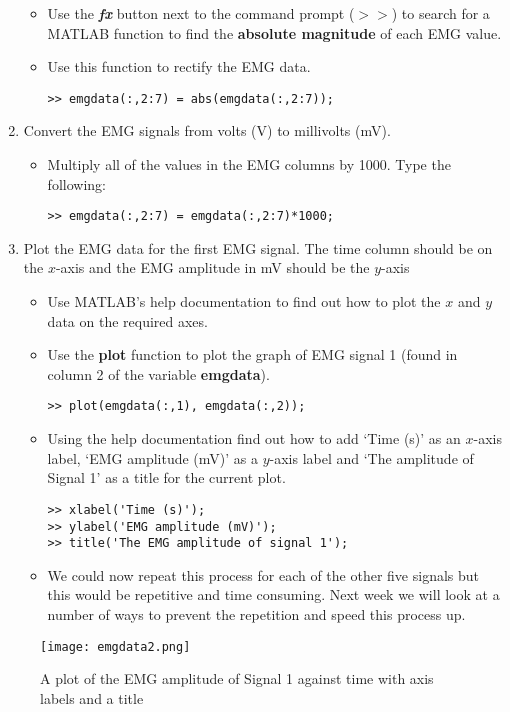\documentclass[12pt,a4paper]{article}
\begin{document}
\begin{enumerate}
\begin{itemize}
		\item Use the \textit{\textbf{fx}} button next to the command prompt ($>>$) to search for a MATLAB function to find the \textbf{absolute magnitude} of each EMG value.
		\item Use this function to rectify the EMG data.		
		\begin{lstlisting}[style=Matlab-editor]
>> emgdata(:,2:7) = abs(emgdata(:,2:7));
		\end{lstlisting}
	\end{itemize}
	\item Convert the EMG signals from volts (V) to millivolts (mV).
	\begin{itemize}
		\item Multiply all of the values in the EMG columns by 1000. 
		Type the following:
		\begin{lstlisting}[style=Matlab-editor]
>> emgdata(:,2:7) = emgdata(:,2:7)*1000;
		\end{lstlisting}
	\end{itemize}
	\item Plot the EMG data for the first EMG signal.  The time column should be on the $x$-axis and the EMG amplitude in mV should be the $y$-axis
	\begin{itemize}
		\item Use MATLAB's help documentation to find out how to plot the $x$ and $y$ data on the required axes.
		\item Use the \textbf{plot} function to plot the graph of EMG signal 1 (found in column 2 of the variable \textbf{emgdata}).
		\begin{lstlisting}[style=Matlab-editor]
>> plot(emgdata(:,1), emgdata(:,2));
		\end{lstlisting}		
		\item Using the help documentation find out how to add `Time (s)' as an $x$-axis label, `EMG amplitude (mV)' as a $y$-axis label and `The amplitude of Signal 1' as a title for the current plot.
		\begin{lstlisting}[style=Matlab-editor]
>> xlabel('Time (s)');
>> ylabel('EMG amplitude (mV)');
>> title('The EMG amplitude of signal 1');
		\end{lstlisting}	
		\item We could now repeat this process for each of the other five signals but this would be repetitive and time consuming.  
		Next week we will look at a number of ways to prevent the repetition and speed this process up.
	\end{itemize}
\end{enumerate}
\begin{figure}[H]
\begin{center}
\texttt{[image: emgdata2.png]}
\caption{A plot of the EMG amplitude of Signal 1 against time with axis labels and a title}
\label{fig:plot}
\end{center}
\end{figure}
\end{document}
